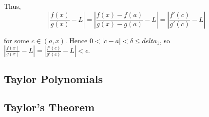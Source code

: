\documentclass[11pt]{article}
\begin{document}
\noindent Thus,\\
\begin{equation*}
|\frac{f(x)}{g(x)} - L| = |\frac{f(x) - f(a)}{g(x) - g(a)} - L| = |\frac{f'(c)}{g'(c)} - L|
\end{equation*}

\noindent for some $c \in (a, x)$. Hence $0 < |c - a| < \delta \leq delta_1$, so $|\frac{f(x)}{g(x)} - L| = |\frac{f'(c)}{g'(c)} - L| < \epsilon$.

\subsection{Taylor Polynomials}

\subsection{Taylor's Theorem}
\end{document}
